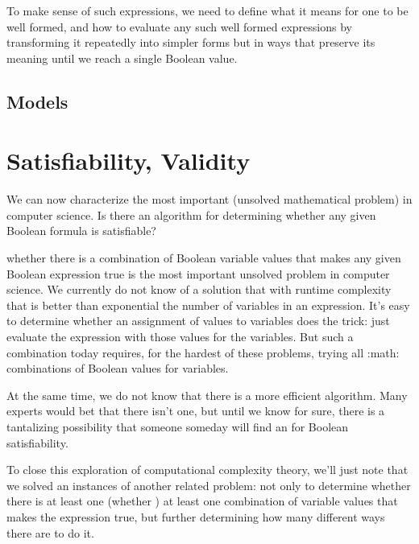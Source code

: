 \documentclass[letterpaper,10pt,english]{sphinxmanual}
\begin{document}
To make sense of such expressions, we need to define what it means for
one to be well formed, and how to evaluate any such well formed
expressions by transforming it repeatedly into simpler forms but in
ways that preserve its meaning until we reach a single Boolean value.


\subsection{Models}
\label{\detokenize{09-propositional-logic:models}}

\section{Satisfiability, Validity}
\label{\detokenize{09-propositional-logic:satisfiability-validity}}
We can now characterize the most important  (unsolved
mathematical problem) in computer science.  Is there an 
algorithm for determining whether any given Boolean formula is
satisfiable?

whether there is a combination of Boolean
variable values that makes any given Boolean expression true is the
most important unsolved problem in computer science. We currently do
not know of a solution that with runtime complexity that is better
than exponential the number of variables in an expression.  It’s easy
to determine whether an assignment of values to variables does the
trick: just evaluate the expression with those values for the
variables. But  such a combination today requires, for the
hardest of these problems, trying all :math: combinations of
Boolean values for  variables.

At the same time, we do not know that there is  a more efficient
algorithm. Many experts would bet that there isn’t one, but until we
know for sure, there is a tantalizing possibility that someone someday
will find an  for Boolean satisfiability.

To close this exploration of computational complexity theory, we’ll
just note that we solved an instances of another related problem: not
only to determine whether there is at least one (whether ) at least one combination of variable values that makes the
expression true, but further determining how many different ways there
are to do it.
\end{document}

